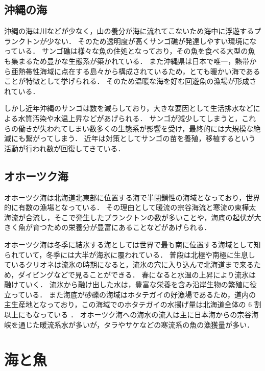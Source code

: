 \documentclass[12pt,a4j,titlepage]{ltjsarticle}
\begin{document}
\subsection{沖縄の海}
沖縄の海は川などが少なく，山の養分が海に流れてこないため海中に浮遊するプランクトンが少ない\cite{okinawa}．
そのため透明度が高くサンゴ礁が発達しやすい環境になっている．
サンゴ礁は様々な魚の住処となっており，その魚を食べる大型の魚も集まるため豊かな生態系が築かれている．
また沖縄県は日本で唯一，熱帯から亜熱帯性海域に点在する島々から構成されているため，とても暖かい海であることが特徴として挙げられる．
そのため温暖な海を好む回遊魚の漁場が形成されている．\par
しかし近年沖縄のサンゴは数を減らしており，大きな要因として生活排水などによる水質汚染や水温上昇などがあげられる．
サンゴが減少してしまうと，これらの働きが失われてしまい数多くの生態系が影響を受け，最終的には大規模な絶滅にも繋がってしまう．
近年は対策としてサンゴの苗を養殖，移植するという活動が行われ数が回復してきている．
\subsection{オホーツク海}
オホーツク海は北海道北東部に位置する海で半閉鎖性の海域となっており，世界的に有数の漁場となっている\cite{ohotuku}．
その理由として暖流の宗谷海流と寒流の東樺太海流が合流し，そこで発生したプランクトンの数が多いことや，海底の起伏が大きく魚が育つための栄養分が豊富にあることなどがあげられる．\par
オホーツク海は冬季に結氷する海としては世界で最も南に位置する海域として知られていて，冬季には大半が海氷に覆われている．
普段は北極や南極に生息しているクリオネは流氷の時期になると，流氷の穴に入り込んで北海道まで来るため，ダイビングなどで見ることができる．
春になると水温の上昇により流氷は融けていく．
流氷から融け出した水は，豊富な栄養を含み沿岸生物の繁殖に役立っている．
また海底が砂礫の海域はホタテガイの好漁場であるため，道内の主生産地となっており，この海域でのホタテガイの水揚げ量は北海道全体の 6 割以上にもなっている ．
オホーツク海への海水の流入は主に日本海からの宗谷海峡を通じた暖流系水が多いが，タラやサケなどの寒流系の魚の漁獲量が多い．
\clearpage

\section{海と魚}\label{海と魚}
\end{document}
